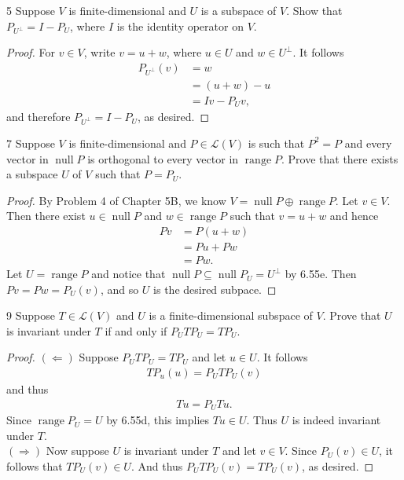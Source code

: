 \documentclass{extarticle}
\newenvironment{problem}[1]{\begin{prob*}{#1}{}}{\end{prob*}}
\newcommand{\Hom}{\mathcal{L}}
\DeclareMathOperator{\Null}{null}
\DeclareMathOperator{\Range}{range}
\begin{document}
\begin{problem}{5}
Suppose $V$ is finite-dimensional and $U$ is a subspace of $V$.  Show that $P_{U^\perp}= I - P_U$, where $I$ is the identity operator on $V$.
\end{problem}
\begin{proof}
For $v\in V$, write $v = u + w$, where $u\in U$ and $w \in U^\perp$.  It follows
\begin{align*}
P_{U^\perp}(v) &= w\\
&= (u + w) - u\\
&= Iv - P_Uv,
\end{align*}
and therefore $P_{U^\perp}= I - P_U$, as desired.
\end{proof}

\begin{problem}{7}
Suppose $V$ is finite-dimensional and $P\in\Hom(V)$ is such that $P^2 = P$ and every vector in $\Null P$ is orthogonal to every vector in $\Range P$.  Prove that there exists a subspace $U$ of $V$ such that $P = P_U$.
\end{problem}
\begin{proof}
By Problem 4 of Chapter 5B, we know $V = \Null P \oplus \Range P$.  Let $v\in V$.  Then there exist $u\in \Null P$ and $w\in \Range P$ such that $v = u + w$ and hence
\begin{align*}
Pv &= P(u + w)\\
&= Pu + Pw\\
&= Pw.
\end{align*}
Let $U = \Range P$ and notice that $\Null P\subseteq \Null P_U = U^\perp$ by 6.55e.  Then $Pv = Pw = P_U(v)$, and so $U$ is the desired subpace.
\end{proof}

\begin{problem}{9}
Suppose $T\in\Hom(V)$ and $U$ is a finite-dimensional subspace of $V$.  Prove that $U$ is invariant under $T$ if and only if $P_U T P_U = TP_U$.
\end{problem}
\begin{proof}
$(\Leftarrow)$ Suppose $P_UTP_U = TP_U$ and let $u \in U$.  It follows
\begin{align*}
TP_u(u) = P_UTP_U(v)
\end{align*}
and thus
\begin{align*}
Tu = P_UTu.
\end{align*}
Since $\Range P_U = U$ by 6.55d, this implies $Tu \in U$.  Thus $U$ is indeed invariant under $T$.\\
\indent $(\Rightarrow)$ Now suppose $U$ is invariant under $T$ and let $v\in V$.  Since $P_U(v) \in U$, it follows that $TP_U(v) \in U$.  And thus $P_UTP_U(v) = TP_U(v)$, as desired.
\end{proof}
\end{document}
